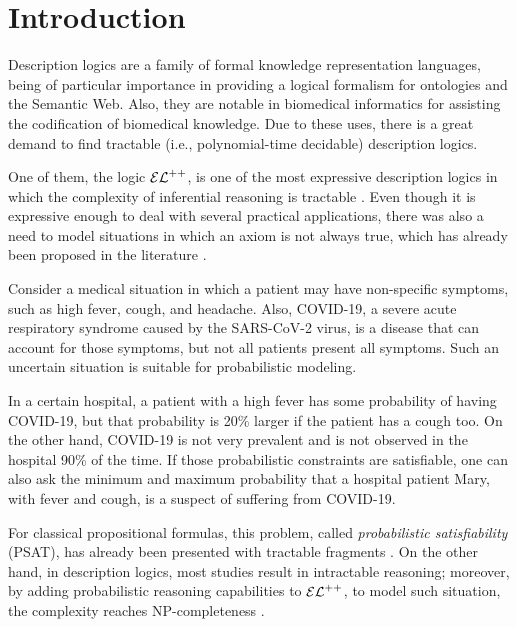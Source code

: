 
\chapter{Introduction}
\label{cap:introduction}
Description logics are a family of formal knowledge representation languages, being of particular importance in providing a logical formalism for ontologies and the Semantic Web. Also, they are notable in biomedical informatics for assisting the codification of biomedical knowledge. Due to these uses, there is a great demand to find tractable (i.e., polynomial-time decidable) description logics.

One of them, the logic $\mathcal{EL}^{++}$, is one of the most expressive description logics in which the complexity of inferential reasoning is tractable \citep{Baader2005a}. Even though it is expressive enough to deal with several practical applications, there was also a need to model situations in which an axiom is not always true, which has already been proposed in the literature \citep{boole1854investigation}.

\begin{example}
  \label{exmp:real-example}
Consider a medical situation in which a patient may have non-specific symptoms, such as high fever, cough, and headache. Also, COVID-19, a severe acute respiratory syndrome caused by the  SARS-CoV-2 virus, is a disease that can account for those symptoms, but not all patients present all symptoms. Such an uncertain situation is suitable for probabilistic modeling.

In a certain hospital, a patient with a high fever has some probability of having COVID-19, but that probability is 20\% larger if the patient has a cough too. On the other hand, COVID-19 is not very prevalent and is not observed in the hospital 90\% of the time. If those probabilistic constraints are satisfiable, one can also ask the minimum and maximum probability that a hospital patient Mary, with fever and cough, is a suspect of suffering from COVID-19.
\end{example}

For classical propositional formulas, this problem, called \emph{probabilistic satisfiability} (PSAT), has already been presented with tractable fragments \citep{andersen2001easy}. On the other hand, in description logics, most studies result in intractable reasoning; moreover, by adding probabilistic reasoning capabilities to $\mathcal{EL}^{++}$, to model such situation, the complexity reaches NP-completeness \citep{Fin2019b}. 

